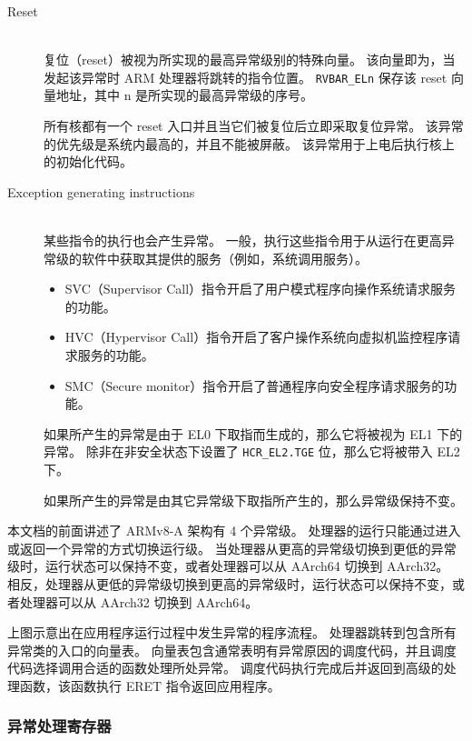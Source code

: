 \begin{description}
  \item[{Reset}] \hfill \\
    复位（reset）被视为所实现的最高异常级别的特殊向量。
    该向量即为，当发起该异常时 ARM 处理器将跳转的指令位置。
    \lstinline!RVBAR_ELn! 保存该 reset 向量地址，其中 n 是所实现的最高异常级的序号。

    所有核都有一个 reset 入口并且当它们被复位后立即采取复位异常。
    该异常的优先级是系统内最高的，并且不能被屏蔽。
    该异常用于上电后执行核上的初始化代码。

  \item[{Exception generating instructions}] \hfill \\
    某些指令的执行也会产生异常。
    一般，执行这些指令用于从运行在更高异常级的软件中获取其提供的服务（例如，系统调用服务）。

    \begin{itemize}
      \item SVC（Supervisor Call）指令开启了用户模式程序向操作系统请求服务的功能。
      \item HVC（Hypervisor Call）指令开启了客户操作系统向虚拟机监控程序请求服务的功能。
      \item SMC（Secure monitor）指令开启了普通程序向安全程序请求服务的功能。
    \end{itemize}

    如果所产生的异常是由于 EL0 下取指而生成的，那么它将被视为 EL1 下的异常。
    除非在非安全状态下设置了 \lstinline!HCR_EL2.TGE! 位，那么它将被带入 EL2 下。

    如果所产生的异常是由其它异常级下取指所产生的，那么异常级保持不变。
\end{description}

本文档的前面讲述了 ARMv8-A 架构有 4 个异常级。
处理器的运行只能通过进入或返回一个异常的方式切换运行级。
当处理器从更高的异常级切换到更低的异常级时，运行状态可以保持不变，或者处理器可以从 AArch64 切换到 AArch32。
相反，处理器从更低的异常级切换到更高的异常级时，运行状态可以保持不变，或者处理器可以从 AArch32 切换到 AArch64。


上图示意出在应用程序运行过程中发生异常的程序流程。
处理器跳转到包含所有异常类的入口的向量表。
向量表包含通常表明有异常原因的调度代码，并且调度代码选择调用合适的函数处理所处异常。
调度代码执行完成后并返回到高级的处理函数，该函数执行 ERET 指令返回应用程序。

\subsubsection{异常处理寄存器}

